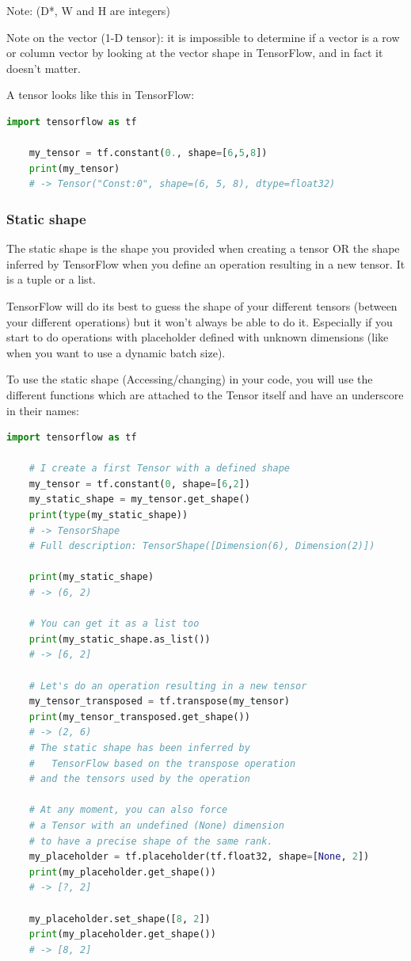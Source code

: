 Note: (D*, W and H are integers)

Note on the vector (1-D tensor): it is impossible to determine if a vector is a row or column vector by looking at the vector shape in TensorFlow, and in fact it doesn’t matter. 

A tensor looks like this in TensorFlow:

\begin{lstlisting}[language=Python]
    import tensorflow as tf

    my_tensor = tf.constant(0., shape=[6,5,8])
    print(my_tensor) 
    # -> Tensor("Const:0", shape=(6, 5, 8), dtype=float32)
\end{lstlisting}

\subsubsection{Static shape}

The static shape is the shape you provided when creating a tensor OR the shape inferred by TensorFlow when you define an operation resulting in a new tensor. It is a tuple or a list.

TensorFlow will do its best to guess the shape of your different tensors (between your different operations) but it won’t always be able to do it. Especially if you start to do operations with placeholder defined with unknown dimensions (like when you want to use a dynamic batch size).

To use the static shape (Accessing/changing) in your code, you will use the different functions which are attached to the Tensor itself and have an underscore in their names:

\begin{lstlisting}[language=Python]
    import tensorflow as tf

    # I create a first Tensor with a defined shape
    my_tensor = tf.constant(0, shape=[6,2])
    my_static_shape = my_tensor.get_shape()
    print(type(my_static_shape)) 
    # -> TensorShape
    # Full description: TensorShape([Dimension(6), Dimension(2)])
    
    print(my_static_shape) 
    # -> (6, 2)
    
    # You can get it as a list too
    print(my_static_shape.as_list()) 
    # -> [6, 2]
    
    # Let's do an operation resulting in a new tensor
    my_tensor_transposed = tf.transpose(my_tensor)
    print(my_tensor_transposed.get_shape()) 
    # -> (2, 6)
    # The static shape has been inferred by 
    #   TensorFlow based on the transpose operation 
    # and the tensors used by the operation
    
    # At any moment, you can also force 
    # a Tensor with an undefined (None) dimension
    # to have a precise shape of the same rank.
    my_placeholder = tf.placeholder(tf.float32, shape=[None, 2])
    print(my_placeholder.get_shape()) 
    # -> [?, 2]
    
    my_placeholder.set_shape([8, 2])
    print(my_placeholder.get_shape()) 
    # -> [8, 2]
\end{lstlisting}

